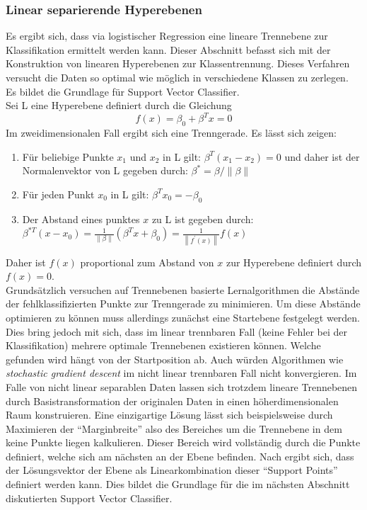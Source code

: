 \subsubsection{Linear separierende Hyperebenen}
Es ergibt sich, dass via logistischer Regression eine lineare Trennebene zur Klassifikation ermittelt werden kann. Dieser Abschnitt befasst sich mit der Konstruktion von linearen Hyperebenen zur Klassentrennung. Dieses Verfahren versucht die Daten so optimal wie möglich in verschiedene Klassen zu zerlegen. Es bildet die Grundlage für Support Vector Classifier. \cite{hyperplanes}\\
Sei L eine Hyperebene definiert durch die Gleichung
\begin{equation}
    f(x)=\beta_{0}+\beta^{T} x=0
\label{eqhyperplane}
\end{equation}
Im zweidimensionalen Fall ergibt sich eine Trenngerade. Es lässt sich zeigen:
\begin{enumerate}
    \item Für beliebige Punkte $x_{1}$ und $x_{2}$ in L gilt: $\beta^{T}\left(x_{1}-x_{2}\right)=0$ und daher ist der Normalenvektor von L gegeben durch: $\beta^{*}=\beta /\|\beta\|$
    \item Für jeden Punkt $x_{0}$ in L gilt: $\beta^{T} x_{0}=-\beta_{0}$
    \item Der Abstand eines punktes $x$ zu L ist gegeben durch: \\
    $\beta^{* T}\left(x-x_{0}\right)=\frac{1}{\|\beta\|}\left(\beta^{T} x+\beta_{0}\right)=\frac{1}{\left\|f^{\prime}(x)\right\|} f(x)$
\end{enumerate}
Daher ist $f(x)$ proportional zum Abstand von $x$ zur Hyperebene definiert durch $f(x)=0$. \cite{hyperplanes}\\
Grundsätzlich versuchen auf Trennebenen basierte Lernalgorithmen die Abstände der fehlklassifizierten Punkte zur Trenngerade zu minimieren. Um diese Abstände optimieren zu können muss allerdings zunächst eine Startebene festgelegt werden. Dies bring jedoch mit sich, dass im linear trennbaren Fall (keine Fehler bei der Klassifikation) mehrere optimale Trennebenen existieren können. Welche gefunden wird hängt von der Startposition ab. Auch würden Algorithmen wie \textit{stochastic gradient descent} im nicht linear trennbaren Fall nicht konvergieren. \cite{hyperplanes} Im Falle von nicht linear separablen Daten lassen sich trotzdem lineare Trennebenen durch Basistransformation der originalen Daten in einen höherdimensionalen Raum konstruieren. Eine einzigartige Lösung lässt sich beispielsweise durch Maximieren der ``Marginbreite'' also des Bereiches um die Trennebene in dem keine Punkte liegen kalkulieren. Dieser Bereich wird vollständig durch die Punkte definiert, welche sich am nächsten an der Ebene befinden. Nach \cite{hastie01statisticallearning} ergibt sich, dass der Lösungsvektor der Ebene als Linearkombination dieser ``Support Points'' definiert werden kann. Dies bildet die Grundlage für die im nächsten Abschnitt diskutierten Support Vector Classifier. 

